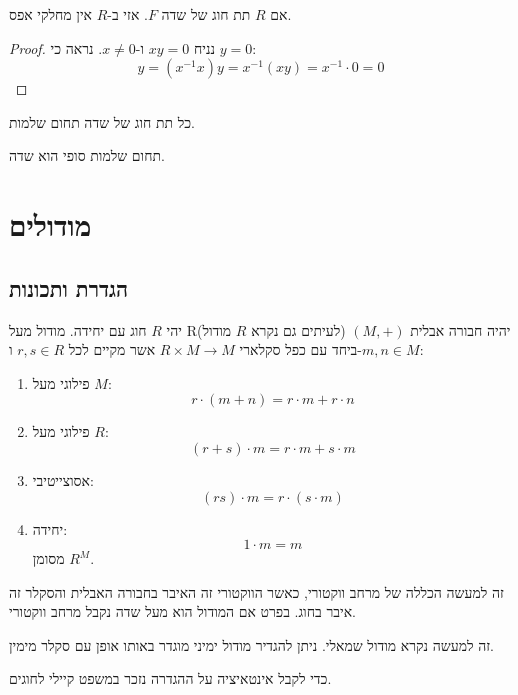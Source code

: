 \documentclass{tstextbook}
\begin{document}
\begin{proposition}
אם \(R\) תת חוג של שדה \(F\). אזי ב-\(R\) אין מחלקי אפס.

\end{proposition}
\begin{proof}
נניח \(xy=0\) ו-\(x\neq 0\). נראה כי \(y=0\):
$$y=\left(x^{-1}x\right)y=x^{-1}\left(x y\right)=x^{-1}\cdot0=0$$

\end{proof}
\begin{corollary}
כל תת חוג של שדה תחום שלמות.

\end{corollary}
\begin{proposition}
תחום שלמות סופי הוא שדה.

\end{proposition}
\chapter{מודולים}

\section{הגדרת ותכונות}

\begin{definition}[מודול]
יהי \(R\) חוג עם יחידה. מודול מעל R(לעיתים גם נקרא \(R\) מודול) יהיה חבורה אבלית \((M,+)\) ביחד עם כפל סקלארי \(R\times M\to M\) אשר מקיים לכל \(r,s \in R\) ו-\(m,n \in M\):

  \begin{enumerate}
    \item פילוגי מעל \(M\): 
$$r\cdot\left(m+n\right)=r\cdot m+r\cdot n$$


    \item פילוגי מעל \(R\): 
$$(r+s)\cdot m=r\cdot m+s\cdot m$$


    \item אסוצייטיבי: 
$$(rs)\cdot m=r\cdot(s\cdot m)$$


    \item יחידה: 
$$1\cdot m= m$$
מסומן \(R^{M}\).


  \end{enumerate}
\end{definition}
\begin{remark}
זה למעשה הכללה של מרחב ווקטורי, כאשר הווקטורי זה האיבר בחבורה האבלית והסקלר זה איבר בחוג. בפרט אם המודול הוא מעל שדה נקבל מרחב ווקטורי.

\end{remark}
\begin{remark}
זה למעשה נקרא מודול שמאלי. ניתן להגדיר מודול ימיני מוגדר באותו אופן עם סקלר מימין.

\end{remark}
כדי לקבל אינטאיציה על ההגדרה נזכר במשפט קיילי לחוגים.
\end{document}
